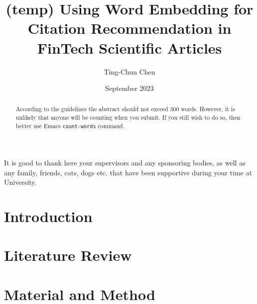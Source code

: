 \documentclass[11pt]{uonthesis}
\title{(temp) Using Word Embedding for Citation Recommendation 
in FinTech Scientific Articles}
\author{Ting-Chun Chen}
\date{September 2023}
\begin{document}
\begin{frontmatter}
\maketitle
\tableofcontents

\begin{abstract}
According to the guidelines the abstract should not exceed 300 words.
However, it is unlikely that anyone will be counting when you submit.
If you still wish to do so, then better use Emacs \verb|count-words|
command.
\end{abstract}

\begin{acknowledgements}
It is good to thank here your supervisors and any sponsoring bodies,
as well as any family, friends, cats, dogs etc. that have been
supportive during your time at University.
\end{acknowledgements}


\end{frontmatter}

\chapter{Introduction}


\chapter{Literature Review}


\chapter{Material and Method}





\end{document}

